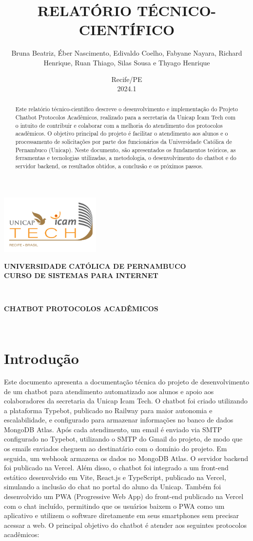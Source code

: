 \documentclass[12pt,a4paper]{article} %
\title{\textbf{\MakeUppercase{Relatório Técnico-Científico}}}
\author{Bruna Beatriz, Éber Nascimento, Edivaldo Coelho, Fabyane Nayara, Richard Henrique, Ruan Thiago, Silas Sousa e Thyago Henrique}
\date{Recife/PE \\ 2024.1}
\renewcommand{\maketitle}{\begin{titlepage}
\begin{center}
\includegraphics[width=5cm]{img/Unicap_Icam_Tech-01.png} \\ %
\vspace*{1cm}

\textbf{\Large\scshape UNIVERSIDADE CATÓLICA DE PERNAMBUCO} \\
\vspace*{0.5cm}
\textbf{\Large\scshape CURSO DE SISTEMAS PARA INTERNET} \\
\vspace*{2cm}

\textbf{\fontsize{18pt}{\baselineskip}\selectfont \MakeUppercase{\thetitle}} \\

\vspace*{0.5cm}

\textbf{\fontsize{14pt}{\baselineskip}\selectfont \MakeUppercase{Chatbot Protocolos Acadêmicos}} \\

\vspace*{2cm}

\textbf{\fontsize{14pt}{\baselineskip}\selectfont \MakeUppercase{\theauthor}} \\

\vfill

\textbf{\Large\MakeUppercase{\thedate}}

\end{center}
\end{titlepage}}
\begin{document}
\maketitle

\newpage

\begin{abstract}
\noindent Este relatório técnico-científico descreve o desenvolvimento e implementação do Projeto Chatbot Protocolos Acadêmicos, realizado para a secretaria da Unicap Icam Tech com o intuito de contribuir e colaborar com a melhoria do atendimento dos protocolos acadêmicos. O objetivo principal do projeto é facilitar o atendimento aos alunos e o processamento de solicitações por parte dos funcionários da Universidade Católica de Pernambuco (Unicap). Neste documento, são apresentados os fundamentos teóricos, as ferramentas e tecnologias utilizadas, a metodologia, o desenvolvimento do chatbot e do servidor backend, os resultados obtidos, a conclusão e os próximos passos.
\end{abstract}

\newpage

\tableofcontents

\newpage

\section{Introdução}

\noindent Este documento apresenta a documentação técnica do projeto de desenvolvimento de um chatbot para atendimento automatizado aos alunos e apoio aos colaboradores da secretaria da Unicap Icam Tech. O chatbot foi criado utilizando a plataforma Typebot, publicado no Railway para maior autonomia e escalabilidade, e configurado para armazenar informações no banco de dados MongoDB Atlas. Após cada atendimento, um email é enviado via SMTP configurado no Typebot, utilizando o SMTP do Gmail do projeto, de modo que os emails enviados cheguem ao destinatário com o domínio do projeto. Em seguida, um webhook armazena os dados no MongoDB Atlas. O servidor backend foi publicado na Vercel. Além disso, o chatbot foi integrado a um front-end estático desenvolvido em Vite, React.js e TypeScript, publicado na Vercel, simulando a inclusão do chat no portal do aluno da Unicap. Também foi desenvolvido um PWA (Progressive Web App) do front-end publicado na Vercel com o chat incluído, permitindo que os usuários baixem o PWA como um aplicativo e utilizem o software diretamente em seus smartphones sem precisar acessar a web. O principal objetivo do chatbot é atender aos seguintes protocolos acadêmicos:
\end{document}
